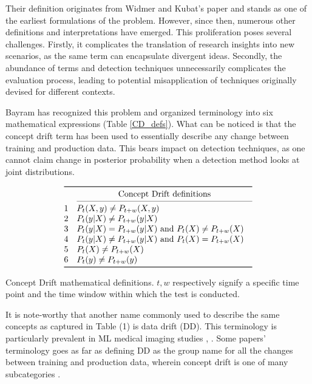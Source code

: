 \documentclass[a4paper]{article}
\begin{document}
Their definition originates from Widmer and Kubat's paper \cite{widmer_learning_1996} and stands as one of the earliest formulations of the problem. However, since then, numerous other definitions and interpretations have emerged. This proliferation poses several challenges. Firstly, it complicates the translation of research insights into new scenarios, as the same term can encapsulate divergent ideas. Secondly, the abundance of terms and detection techniques unnecessarily complicates the evaluation process, leading to potential misapplication of techniques originally devised for different contexts.

Bayram \cite{bayram_concept_2022} has recognized this problem and organized terminology into six mathematical expressions (Table \ref{CD_defs}). What can be noticed is that the concept drift term has been used to essentially describe any change between training and production data. This bears impact on detection techniques, as one cannot claim change in posterior probability when a detection method looks at joint distributions.

\begin{table}[]
    \centering
    \def\arraystretch{1.3}
    \begin{equation}
    \begin{array}{@{}lll@{}}
    \toprule
      & \multicolumn{2}{c@{}}{\text{Concept Drift definitions}} \\
    \cmidrule(l){2-3}
      1 & P_t(X,y) \neq P_{t+w}(X,y) & \\
      2 &  P_t(y|X) \neq P_{t+w}(y|X) \\
      3 &  P_t(y|X) = P_{t+w}(y|X) \text{ and } P_t(X) \neq P_{t+w}(X) \\
      4 &  P_t(y|X) \neq P_{t+w}(y|X) \text{ and } P_t(X) = P_{t+w}(X) \\
      5 &  P_t(X) \neq P_{t+w}(X)  \\ 
      6 &  P_t(y) \neq P_{t+w}(y)  \\
    \bottomrule
    \end{array}
    \end{equation}
    \caption{Concept Drift mathematical definitions. $t, w$ respectively signify a specific time point and the time window within which the test is conducted.}
    \label{CD_defs}
\end{table}

It is note-worthy that another name commonly used to describe the same concepts as captured in Table (1) is data drift (DD). This terminology is particularly prevalent in ML medical imaging studies \cite{soin_chexstray_2022}, \cite{oala_data_2023}. Some papers' terminology goes as far as defining DD as the group name for all the changes between training and production data, wherein concept drift is one of many subcategories \cite{kore_empirical_2024}.
\end{document}
